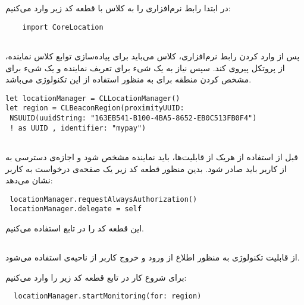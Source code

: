 \documentclass[oneside]{report}
\begin{document}
در ابتدا رابط نرم‌افزاری 
	{\normalsize {}}
	را به کلاس با قطعه کد زیر وارد می‌کنیم: 
	\begin{latin}
		\begin{verbatim}
	import CoreLocation
	
		\end{verbatim}
		
	\end{latin}	
	 پس از وارد کردن رابط نرم‌افزاری،  کلاس 
	 {\normalsize {}}
	 می‌باید برای پیاده‌سازی توابع کلاس نماینده، از پروتکل 
		 {\normalsize {}}
	پیروی کند. سپس نیاز به یک شیء برای  تعریف نماینده و یک شیء برای مشخص کردن منطقه برای 
					{\normalsize {}} 
	به منظور استفاده از این تکنولوژی می‌باشد. 
		\begin{latin}
		\begin{verbatim}
let locationManager = CLLocationManager()
let region = CLBeaconRegion(proximityUUID:
 NSUUID(uuidString: "163EB541-B100-4BA5-8652-EB0C513FB0F4")
 ! as UUID , identifier: "mypay")
		
		\end{verbatim}
		
	\end{latin}	
	قبل از استفاده از هریک از قابلیت‌ها، باید نماینده مشخص شود و اجازه‌ی دسترسی به 
					{\normalsize {}}
	از کاربر باید صادر شود. بدین منظور قطعه کد زیر یک صفحه‌ی درخواست به کاربر نشان می‌دهد: 
				\begin{latin}
				\begin{verbatim}
 locationManager.requestAlwaysAuthorization()
 locationManager.delegate = self

				\end{verbatim}
				
			\end{latin}	
		این قطعه کد را در تابع 
			{\normalsize {}}
			استفاده می‌کنیم.		 
	
	\subsection{{\small {}}}
	از قابلیت 
	{\normalsize {}}
	تکنولوژی
	{\normalsize {}}
	 به منظور اطلاع از ورود و خروج کاربر از ناحیه‌ی 
	{\normalsize {}}
	استفاده می‌شود.
	
	برای شروع کار 
	{\normalsize {}}
	در تابع 
	{\normalsize {}}
	قطعه کد زیر را وارد می‌کنیم:
	\begin{latin}
	\begin{verbatim}
  locationManager.startMonitoring(for: region)

	\end{verbatim}
	
\end{latin}		
	
\end{document}
